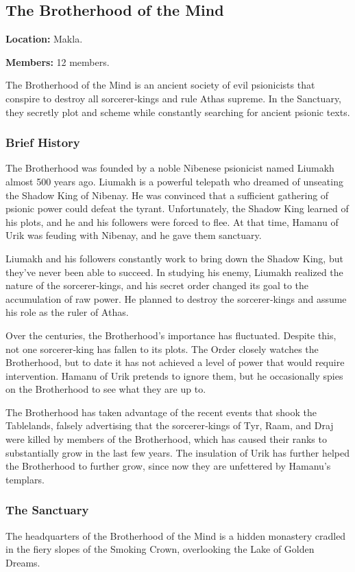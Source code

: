 \subsection{The Brotherhood of the Mind}
\textbf{Location:} Makla.

\textbf{Members:} 12 members.

The Brotherhood of the Mind is an ancient society of evil psionicists that conspire to destroy all sorcerer‐kings and rule Athas supreme. In the Sanctuary, they secretly plot and scheme while constantly searching for ancient psionic texts.

\subsubsection{Brief History}
The Brotherhood was founded by a noble Nibenese psionicist named Liumakh almost 500 years ago. Liumakh is a powerful telepath who dreamed of unseating the Shadow King of Nibenay. He was convinced that a sufficient gathering of psionic power could defeat the tyrant. Unfortunately, the Shadow King learned of his plots, and he and his followers were forced to flee. At that time, Hamanu of Urik was feuding with Nibenay, and he gave them sanctuary.

Liumakh and his followers constantly work to bring down the Shadow King, but they've never been able to succeed. In studying his enemy, Liumakh realized the nature of the sorcerer‐kings, and his secret order changed its goal to the accumulation of raw power. He planned to destroy the sorcerer‐kings and assume his role as the ruler of Athas.

Over the centuries, the Brotherhood's importance has fluctuated. Despite this, not one sorcerer‐king has fallen to its plots. The Order closely watches the Brotherhood, but to date it has not achieved a level of power that would require intervention. Hamanu of Urik pretends to ignore them, but he occasionally spies on the Brotherhood to see what they are up to.

The Brotherhood has taken advantage of the recent events that shook the Tablelands, falsely advertising that the sorcerer‐kings of Tyr, Raam, and Draj were killed by members of the Brotherhood, which has caused their ranks to substantially grow in the last few years. The insulation of Urik has further helped the Brotherhood to further grow, since now they are unfettered by Hamanu's templars.

\subsubsection{The Sanctuary}
The headquarters of the Brotherhood of the Mind is a hidden monastery cradled in the fiery slopes of the Smoking Crown, overlooking the Lake of Golden Dreams.

